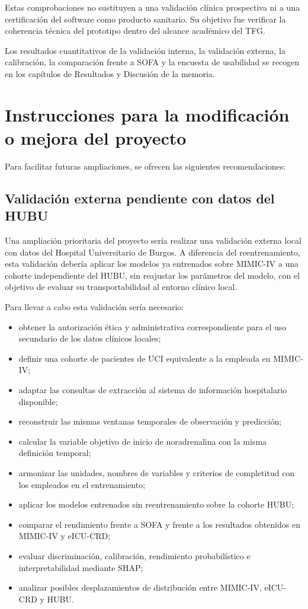 \documentclass[
  spanish,
  a4paper,
  12pt,
  twoside]{memoir}
\begin{document}
Estas comprobaciones no sustituyen a una validación clínica prospectiva ni a una certificación del software como producto sanitario. Su objetivo fue verificar la coherencia
técnica del prototipo dentro del alcance académico del TFG.

Los resultados cuantitativos de la validación interna, la validación externa, la calibración, la comparación frente a SOFA y la encuesta de usabilidad se recogen en los 
capítulos de Resultados y Discusión de la memoria.

\section{Instrucciones para la modificación o mejora del proyecto}

Para facilitar futuras ampliaciones, se ofrecen las siguientes recomendaciones:

\subsection*{Validación externa pendiente con datos del HUBU}

Una ampliación prioritaria del proyecto sería realizar una validación externa local con datos del Hospital Universitario de Burgos. A diferencia del reentrenamiento, esta
 validación debería aplicar los modelos ya entrenados sobre MIMIC-IV a una cohorte independiente del HUBU, sin reajustar los parámetros del modelo, con el objetivo de
  evaluar su transportabilidad al entorno clínico local.

Para llevar a cabo esta validación sería necesario:

\begin{itemize}
  \item obtener la autorización ética y administrativa correspondiente para el uso secundario de los datos clínicos locales;
  \item definir una cohorte de pacientes de UCI equivalente a la empleada en MIMIC-IV;
  \item adaptar las consultas de extracción al sistema de información hospitalario disponible;
  \item reconstruir las mismas ventanas temporales de observación y predicción;
  \item calcular la variable objetivo de inicio de noradrenalina con la misma definición temporal;
  \item armonizar las unidades, nombres de variables y criterios de completitud con los empleados en el entrenamiento;
  \item aplicar los modelos entrenados sin reentrenamiento sobre la cohorte HUBU;
  \item comparar el rendimiento frente a SOFA y frente a los resultados obtenidos en MIMIC-IV y eICU-CRD;
  \item evaluar discriminación, calibración, rendimiento probabilístico e interpretabilidad mediante SHAP;
  \item analizar posibles desplazamientos de distribución entre MIMIC-IV, eICU-CRD y HUBU.
\end{itemize}
\end{document}
